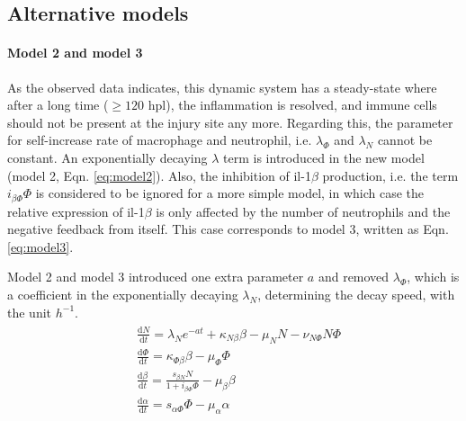 \subsection{Alternative models}

\paragraph{Model 2 and model 3}

As the observed data indicates, this dynamic system has a steady-state where after a long time ($\geq 120$ hpl), the inflammation is resolved, and immune cells should not be present at the injury site any more. Regarding this, the parameter for self-increase rate of macrophage and neutrophil, i.e. $\lambda_\Phi$ and $\lambda_N$  cannot be constant. An exponentially decaying $\lambda$ term is introduced in the new model (model 2, Eqn. \ref{eq:model2}). Also, the inhibition of il-1$\beta$ production, i.e. the term $i_{\beta\Phi}\Phi$ is considered to be ignored for a more simple model, in which case the relative expression of il-1$\beta$ is only affected by the number of neutrophils and the negative feedback from itself. This case corresponds to model 3, written as Eqn. \ref{eq:model3}.

Model 2 and model 3 introduced one extra parameter $a$ and removed $\lambda_\Phi$, which is a coefficient in the exponentially decaying $\lambda_N$, determining the decay speed, with the unit $h^{-1}$.
\begin{align}
    \label{eq:model2}
    \begin{split}
        &\frac{\mathrm{d} N}{\mathrm{d} t}=\lambda_Ne^{-at}+\kappa_{N\beta}\beta-\mu_NN-\nu_{N\Phi}N\Phi\\
        &\frac{\mathrm{d} \Phi}{\mathrm{d} t}=\kappa_{\Phi\beta}\beta-\mu_\Phi\Phi\\
        &\frac{\mathrm{d} \beta}{\mathrm{d} t}=\frac{s_{\beta N}N}{1+i_{\beta\Phi}\Phi}-\mu_\beta\beta\\
        &\frac{\mathrm{d} \alpha}{\mathrm{d} t}=s_{\alpha\Phi}\Phi-\mu_\alpha\alpha
    \end{split}
\end{align}

